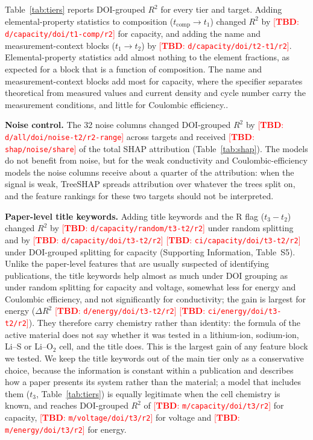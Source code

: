 \documentclass[journal=jcisd8,manuscript=article,layout=traditional]{achemso}
\newcommand{\TBD}[1]{\textcolor{red}{[\textbf{TBD}: \nolinkurl{#1}]}}
\begin{document}
Table~\ref{tab:tiers} reports DOI-grouped $R^2$ for every tier and target. Adding elemental-property statistics to composition ($t_{\mathrm{comp}} \rightarrow t_1$) changed $R^2$ by \TBD{d/capacity/doi/t1-comp/r2} for capacity, and adding the name and measurement-context blocks ($t_1 \rightarrow t_2$) by \TBD{d/capacity/doi/t2-t1/r2}. Elemental-property statistics add almost nothing to the element fractions, as expected for a block that is a function of composition. The name and measurement-context blocks add most for capacity, where the specifier separates theoretical from measured values and current density and cycle number carry the measurement conditions, and little for Coulombic efficiency..

\textbf{Noise control.} The 32 noise columns changed DOI-grouped $R^2$ by \TBD{d/all/doi/noise-t2/r2-range} across targets and received \TBD{shap/noise/share} of the total SHAP attribution (Table~\ref{tab:shap}). The models do not benefit from noise, but for the weak conductivity and Coulombic-efficiency models the noise columns receive about a quarter of the attribution: when the signal is weak, TreeSHAP spreads attribution over whatever the trees split on, and the feature rankings for these two targets should not be interpreted.

\textbf{Paper-level title keywords.} Adding title keywords and the R flag ($t_3 - t_2$) changed $R^2$ by \TBD{d/capacity/random/t3-t2/r2} under random splitting and by \TBD{d/capacity/doi/t3-t2/r2} \TBD{ci/capacity/doi/t3-t2/r2} under DOI-grouped splitting for capacity (Supporting Information, Table~S5). Unlike the paper-level features that are usually suspected of identifying publications, the title keywords help almost as much under DOI grouping as under random splitting for capacity and voltage, somewhat less for energy and Coulombic efficiency, and not significantly for conductivity; the gain is largest for energy ($\Delta R^2$ \TBD{d/energy/doi/t3-t2/r2} \TBD{ci/energy/doi/t3-t2/r2}). They therefore carry chemistry rather than identity: the formula of the active material does not say whether it was tested in a lithium-ion, sodium-ion, Li--S or Li--O$_2$ cell, and the title does. This is the largest gain of any feature block we tested. We keep the title keywords out of the main tier only as a conservative choice, because the information is constant within a publication and describes how a paper presents its system rather than the material; a model that includes them ($t_3$, Table~\ref{tab:tiers}) is equally legitimate when the cell chemistry is known, and reaches DOI-grouped $R^2$ of \TBD{m/capacity/doi/t3/r2} for capacity, \TBD{m/voltage/doi/t3/r2} for voltage and \TBD{m/energy/doi/t3/r2} for energy.
\end{document}
